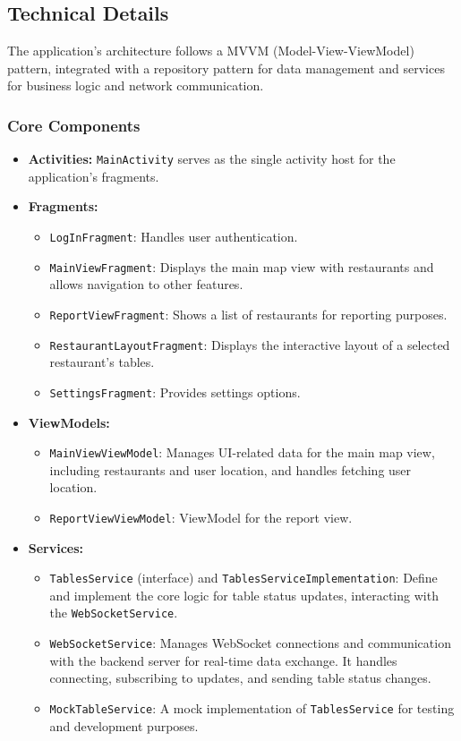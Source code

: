 \documentclass{article}
\begin{document}
\subsection{Technical Details}
The application's architecture follows a MVVM (Model-View-ViewModel) pattern, integrated with a repository pattern for data management and services for business logic and network communication.

\subsubsection{Core Components}
\begin{itemize}
    \item \textbf{Activities:} \texttt{MainActivity} serves as the single activity host for the application's fragments.

    \item \textbf{Fragments:}
    \begin{itemize}[leftmargin=2em]
        \item \texttt{LogInFragment}: Handles user authentication.
        \item \texttt{MainViewFragment}: Displays the main map view with restaurants and allows navigation to other features.
        \item \texttt{ReportViewFragment}: Shows a list of restaurants for reporting purposes.
        \item \texttt{RestaurantLayoutFragment}: Displays the interactive layout of a selected restaurant's tables.
        \item \texttt{SettingsFragment}: Provides settings options.
    \end{itemize}

    \item \textbf{ViewModels:}
    \begin{itemize}[leftmargin=2em]
        \item \texttt{MainViewViewModel}: Manages UI-related data for the main map view, including restaurants and user location, and handles fetching user location.
        \item \texttt{ReportViewViewModel}: ViewModel for the report view.
    \end{itemize}

    \item \textbf{Services:}
    \begin{itemize}[leftmargin=2em]
        \item \texttt{TablesService} (interface) and \texttt{TablesServiceImplementation}: Define and implement the core logic for table status updates, interacting with the \texttt{WebSocketService}.
        \item \texttt{WebSocketService}: Manages WebSocket connections and communication with the backend server for real-time data exchange. It handles connecting, subscribing to updates, and sending table status changes.
        \item \texttt{MockTableService}: A mock implementation of \texttt{TablesService} for testing and development purposes.
    \end{itemize}


\end{itemize}
\end{document}
